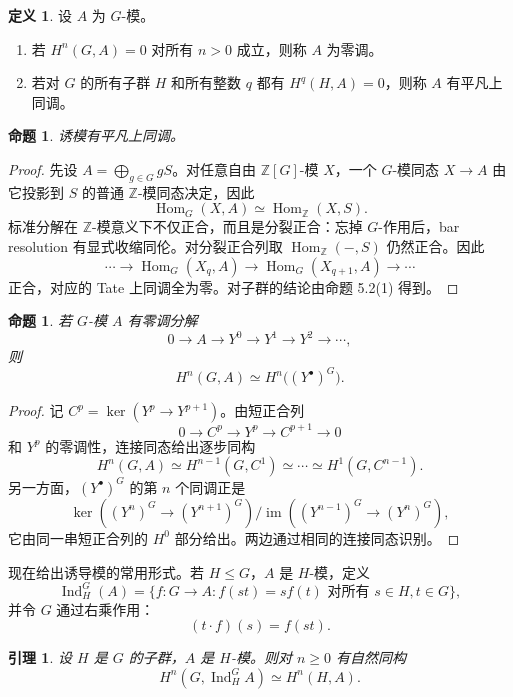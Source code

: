 \documentclass[11pt,a4paper,openany]{ctexbook}
\numberwithin{equation}{chapter}
\newcommand{\Z}{\mathbb{Z}}
\theoremstyle{plain}
\newtheorem{proposition}[theorem]{命题}
\newtheorem{lemma}[theorem]{引理}
\theoremstyle{definition}
\newtheorem{definition}[theorem]{定义}
\theoremstyle{remark}
\begin{document}
\begin{definition}
设 $A$ 为 $G$-模。
\begin{enumerate}[label=(\arabic*)]
\item 若 $H^n(G,A)=0$ 对所有 $n>0$ 成立，则称 $A$ 为零调。
\item 若对 $G$ 的所有子群 $H$ 和所有整数 $q$ 都有 $H^q(H,A)=0$，则称 $A$ 有平凡上同调。
\end{enumerate}
\end{definition}

\begin{proposition}
诱模有平凡上同调。
\end{proposition}

\begin{proof}
先设 $A=\bigoplus_{g\in G}gS$。对任意自由 $\Z[G]$-模 $X$，一个 $G$-模同态 $X\to A$ 由它投影到 $S$ 的普通 $\Z$-模同态决定，因此
\[
 \operatorname{Hom}_G(X,A)\simeq \operatorname{Hom}_\Z(X,S).
\]
标准分解在 $\Z$-模意义下不仅正合，而且是分裂正合：忘掉 $G$-作用后，bar resolution
有显式收缩同伦。对分裂正合列取 $\operatorname{Hom}_\Z(-,S)$ 仍然正合。因此
\[
\cdots\to \operatorname{Hom}_G(X_q,A)\to
\operatorname{Hom}_G(X_{q+1},A)\to\cdots
\]
正合，对应的 Tate 上同调全为零。对子群的结论由命题 5.2(1) 得到。
\end{proof}

\begin{proposition}
若 $G$-模 $A$ 有零调分解
\[
 0\to A\to Y^0\to Y^1\to Y^2\to\cdots,
\]
则
\[
 H^n(G,A)\simeq H^n\bigl((Y^\bullet)^G\bigr).
\]
\end{proposition}

\begin{proof}
记 $C^p=\ker(Y^p\to Y^{p+1})$。由短正合列
\[
 0\to C^p\to Y^p\to C^{p+1}\to0
\]
和 $Y^p$ 的零调性，连接同态给出逐步同构
\[
 H^n(G,A)\simeq H^{n-1}(G,C^1)\simeq\cdots\simeq H^1(G,C^{n-1}).
\]
另一方面，$(Y^\bullet)^G$ 的第 $n$ 个同调正是
\[
 \ker((Y^n)^G\to(Y^{n+1})^G)/
 \operatorname{im}((Y^{n-1})^G\to(Y^n)^G),
\]
它由同一串短正合列的 $H^0$ 部分给出。两边通过相同的连接同态识别。
\end{proof}

现在给出诱导模的常用形式。若 $H\le G$，$A$ 是 $H$-模，定义
\[
 \operatorname{Ind}_H^G(A)=
 \{f:G\to A:f(st)=sf(t)\text{ 对所有 }s\in H,t\in G\},
\]
并令 $G$ 通过右乘作用：
\[
 (t\cdot f)(s)=f(st).
\]

\begin{lemma}
设 $H$ 是 $G$ 的子群，$A$ 是 $H$-模。则对 $n\ge0$ 有自然同构
\[
 H^n(G,\operatorname{Ind}_H^G A)\simeq H^n(H,A).
\]
\end{lemma}
\end{document}
